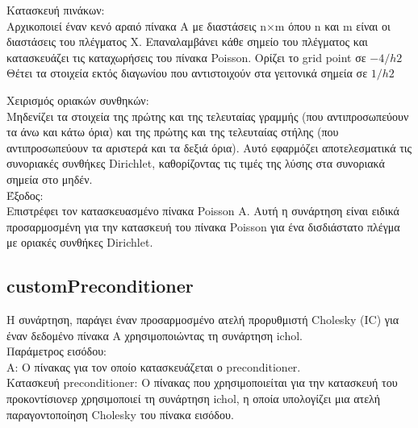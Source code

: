 \documentclass[12pt,a4paper]{article}
\begin{document}
Κατασκευή πινάκων:\\
Αρχικοποιεί έναν κενό αραιό πίνακα A με διαστάσεις n×m όπου n και m είναι οι διαστάσεις του πλέγματος X. Επαναλαμβάνει κάθε σημείο του πλέγματος και κατασκευάζει τις καταχωρήσεις του πίνακα Poisson.
Ορίζει το grid point σε $-4/h2$
Θέτει τα στοιχεία εκτός διαγωνίου που αντιστοιχούν στα γειτονικά σημεία σε $1/h2$\\

Χειρισμός οριακών συνθηκών:\\
Μηδενίζει τα στοιχεία της πρώτης και της τελευταίας γραμμής (που αντιπροσωπεύουν τα άνω και κάτω όρια) και της πρώτης και της τελευταίας στήλης (που αντιπροσωπεύουν τα αριστερά και τα δεξιά όρια). Αυτό εφαρμόζει αποτελεσματικά τις συνοριακές συνθήκες Dirichlet, καθορίζοντας τις τιμές της λύσης στα συνοριακά σημεία στο μηδέν.\\

Έξοδος:\\
Επιστρέφει τον κατασκευασμένο πίνακα Poisson A.
Αυτή η συνάρτηση είναι ειδικά προσαρμοσμένη για την κατασκευή του πίνακα Poisson για ένα δισδιάστατο πλέγμα με οριακές συνθήκες Dirichlet.

\subsection{customPreconditioner}
H συνάρτηση, παράγει έναν προσαρμοσμένο ατελή προρυθμιστή Cholesky (IC) για έναν δεδομένο πίνακα A χρησιμοποιώντας τη συνάρτηση ichol.\\

Παράμετρος εισόδου:\\
A: Ο πίνακας για τον οποίο κατασκευάζεται ο preconditioner.\\
Κατασκευή preconditioner: Ο πίνακας που χρησιμοποιείται για την κατασκευή του προκοντίσιονερ χρησιμοποιεί τη συνάρτηση ichol, η οποία υπολογίζει μια ατελή παραγοντοποίηση Cholesky του πίνακα εισόδου.\\
\end{document}
